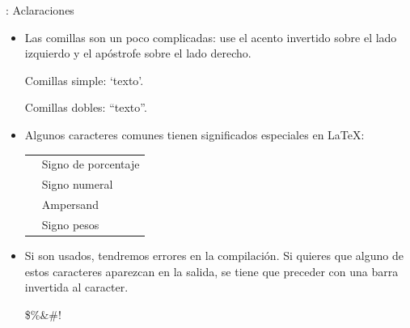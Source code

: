 \documentclass{beamer}
\begin{document}
\begin{frame}[fragile]{\insertsubsection{}: Aclaraciones}
  \small
  \begin{itemize}
  \item Las comillas son un poco complicadas: use el acento invertido
    \keystroke{\`{}} sobre el lado izquierdo y el apóstrofe
    \keystroke{\'{}} sobre el lado derecho.
    \begin{exampletwouptiny}
 Comillas simple: `texto'.

 Comillas dobles: ``texto''.
    \end{exampletwouptiny}
    
  \item Algunos caracteres comunes tienen significados especiales en \LaTeX:\\[1ex]
    \begin{tabular}{cl}
      \keystrokebftt{\%} & Signo de porcentaje \\
      \keystrokebftt{\#} & Signo numeral \\
      \keystrokebftt{\&} & Ampersand                 \\
      \keystrokebftt{\$} & Signo pesos               \\
    \end{tabular}
  \item Si son usados, tendremos errores en la compilación. Si quieres
    que alguno de estos caracteres aparezcan en la salida, se tiene que
    preceder con una barra invertida al caracter.
    \begin{exampletwoup}
      \$\%\&\#!
    \end{exampletwoup}
  \end{itemize}
\end{frame}
\end{document}
